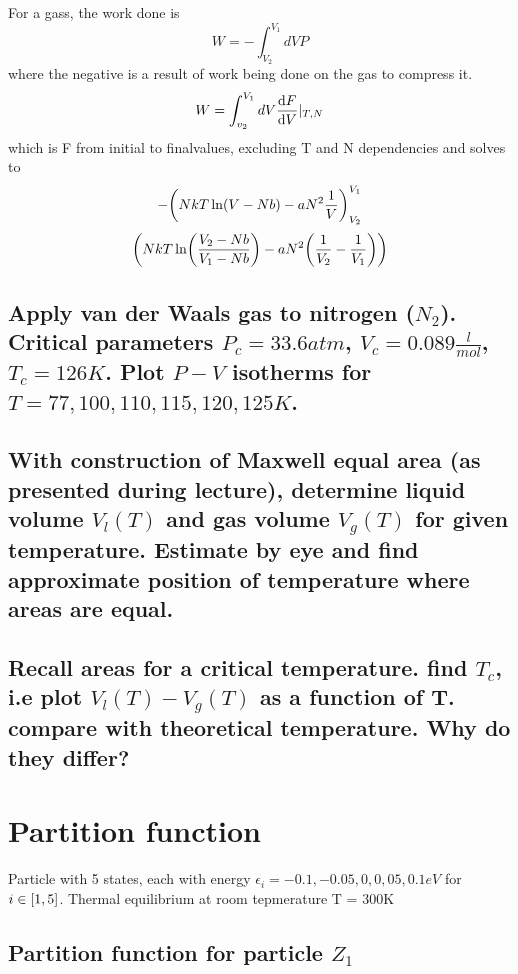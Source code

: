 \documentclass[a4paper,11pt]{article}
\begin{document}
\subsubsection{}
For a gass, the work done is
\[ W = -\int_{V_2}^{V_1} dV P \]
where the negative is a result of work being done on the gas to compress it. 
\[ W = \int_{v_2}^{V_1} dV \dv{F}{V}|_{T,N} \]
 which is F from initial to finalvalues, excluding T and N dependencies and solves to
\[ - \qty( NkT\ln( V - Nb) - aN^2\frac{1}{V} )_{V_2}^{V_1} \]
\[ \qty( NkT\ln(\frac{V_2 - Nb}{V_1 - Nb}) - aN^2\qty(\frac{1}{V_2} - \frac{1}{V_1} ) ) \]


\subsection{ Apply van der Waals gas to nitrogen ($N_2$). Critical parameters $P_c = 33.6atm$, 
            $V_c = 0.089\frac{l}{mol}$, $T_c = 126 K$. Plot $P - V$ isotherms for $T = 77, 100, 110, 115, 120, 125 K$. }%


\subsection{ With construction of Maxwell equal area (as presented during lecture), determine liquid volume $V_l(T)$
            and gas volume $V_g(T)$ for given temperature. Estimate by eye and find approximate position of temperature
            where areas are equal. } %


\subsection{ Recall areas for a critical temperature. find $T_c$, i.e plot $V_l(T) - V_g(T)$ as a function of T. 
            compare with theoretical temperature. Why do they differ? }%


\section{ Partition function }
Particle with 5 states, each with energy $\epsilon_i = -0.1, -0.05, 0, 0,05, 0.1 eV$ for $i\in \qty[1, 5]$. Thermal 
equilibrium at room tepmerature T = 300K

\subsection{ Partition function for particle $Z_1$ }%
\end{document}

